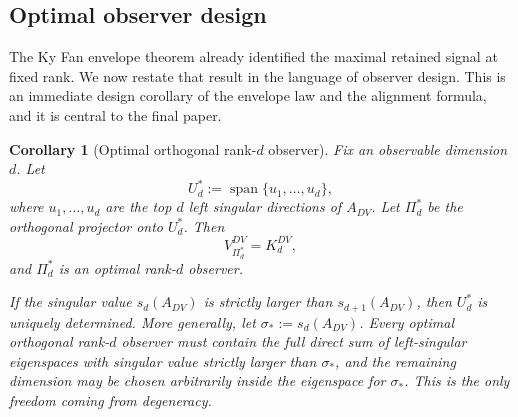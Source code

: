 \documentclass[11pt,a4paper]{article}
\numberwithin{equation}{section}
\theoremstyle{thmcompact}
\newtheorem{corollary}[theorem]{Corollary}
\theoremstyle{remark}
\begin{document}
\subsection{Optimal observer design}

The Ky Fan envelope theorem already identified the maximal retained signal at fixed rank. We now restate that result in the language of observer design. This is an immediate design corollary of the envelope law and the alignment formula, and it is central to the final paper.

\begin{corollary}[Optimal orthogonal rank-\(d\) observer]
\label{cor:optimal_finite_observer}
Fix an observable dimension \(d\). Let
\begin{equation}
U_d^\ast:=\operatorname{span}\{u_1,\dots,u_d\},
\end{equation}
where \(u_1,\dots,u_d\) are the top \(d\) left singular directions of \(A_{DV}\). Let \(\Pi_d^\ast\) be the orthogonal projector onto \(U_d^\ast\). Then
\begin{equation}
V_{\Pi_d^\ast}^{DV}=K_d^{DV},
\end{equation}
and \(\Pi_d^\ast\) is an optimal rank-\(d\) observer.

If the singular value \(s_d(A_{DV})\) is strictly larger than \(s_{d+1}(A_{DV})\), then \(U_d^\ast\) is uniquely determined. More generally, let \(\sigma_\ast:=s_d(A_{DV})\). Every optimal orthogonal rank-\(d\) observer must contain the full direct sum of left-singular eigenspaces with singular value strictly larger than \(\sigma_\ast\), and the remaining dimension may be chosen arbitrarily inside the eigenspace for \(\sigma_\ast\). This is the only freedom coming from degeneracy.
\end{corollary}
\end{document}
